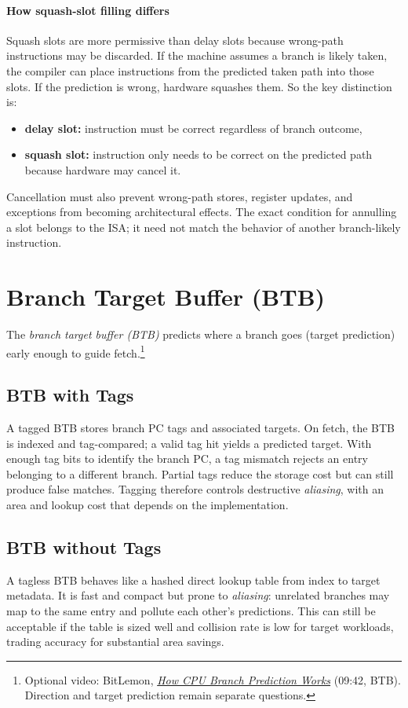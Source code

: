 \paragraph{How squash-slot filling differs}\label{par:auto-025h}
Squash slots are more permissive than delay slots because wrong-path instructions may be discarded.
If the machine assumes a branch is likely taken, the compiler can place instructions from the predicted taken path into those slots.
If the prediction is wrong, hardware squashes them.
So the key distinction is:
\begin{itemize}
    \item \textbf{delay slot:} instruction must be correct regardless of branch outcome,
    \item \textbf{squash slot:} instruction only needs to be correct on the predicted path because hardware may cancel it.
\end{itemize}
Cancellation must also prevent wrong-path stores, register updates, and exceptions from becoming architectural effects.
The exact condition for annulling a slot belongs to the ISA; it need not match the behavior of another branch-likely instruction.


\section{Branch Target Buffer (BTB)}\label{sec:auto-042}
The \textit{branch target buffer (BTB)} predicts where a branch goes (target prediction) early enough to guide fetch.\footnote{Optional video: BitLemon, \href{https://youtu.be/UbDIoNY9E0w?t=582}{\emph{How CPU Branch Prediction Works}} (09:42, BTB). Direction and target prediction remain separate questions.}

\subsection{BTB with Tags}\label{subsec:auto-009}
A tagged BTB stores branch PC tags and associated targets.
On fetch, the BTB is indexed and tag-compared; a valid tag hit yields a predicted target.
With enough tag bits to identify the branch PC, a tag mismatch rejects an entry belonging to a different branch.
Partial tags reduce the storage cost but can still produce false matches.
Tagging therefore controls destructive \textit{aliasing}, with an area and lookup cost that depends on the implementation.

\subsection{BTB without Tags}\label{subsec:auto-010}
A tagless BTB behaves like a hashed direct lookup table from index to target metadata.
It is fast and compact but prone to \textit{aliasing}: unrelated branches may map to the same entry and pollute each other's predictions.
This can still be acceptable if the table is sized well and collision rate is low for target workloads, trading accuracy for substantial area savings.

